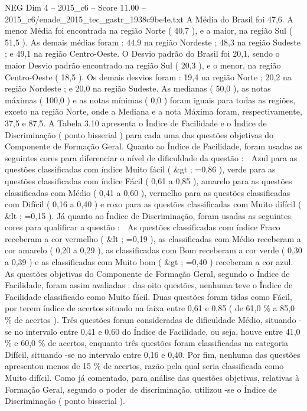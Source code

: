 \begin{textsample}{NEG Dim 4 – 2015\_c6 – Score 11.00 – 2015\_c6/enade\_2015\_tec\_gastr\_1938c9be4e.txt}
A Média do Brasil foi 47,6.
A menor Média foi encontrada na região Norte ( 40,7 ), e a maior, na região Sul ( 51,5 ).
As demais médias foram : 44,9 na região Nordeste ; 48,3 na região Sudeste ; e 49,1 na região Centro-Oeste.
O Desvio padrão do Brasil foi 20,1, sendo o maior Desvio padrão encontrado na região Sul ( 20,3 ), e o menor, na região Centro-Oeste ( 18,5 ).
Os demais desvios foram : 19,4 na região Norte ; 20,2 na região Nordeste ; e 20,0 na região Sudeste.
As medianas ( 50,0 ), as notas máximas ( 100,0 ) e as notas mínimas ( 0,0 ) foram iguais para todas as regiões, exceto na região Norte, onde a Mediana e a nota Máxima foram, respectivamente, 37,5 e 87,5.
A Tabela 3.10 apresenta o Índice de Facilidade e o Índice de Discriminação ( ponto bisserial ) para cada uma das questões objetivas do Componente de Formação Geral.
Quanto ao Índice de Facilidade, foram usadas as seguintes cores para diferenciar o nível de dificuldade da questão :  Azul para as questões classificadas com índice Muito fácil ( \&gt ; =0,86 ), verde para as questões classificadas com índice Fácil ( 0,61 a 0,85 ), amarelo para as questões classificadas com Médio ( 0,41 a 0,60 ), vermelho para as questões classificadas com Difícil ( 0,16 a 0,40 ) e roxo para as questões classificadas com Muito difícil ( \&lt ; =0,15 ).
Já quanto ao Índice de Discriminação, foram usadas as seguintes cores para qualificar a questão :  As questões classificadas com índice Fraco receberam a cor vermelho ( \&lt ; =0,19 ), as classificadas com Médio receberam a cor amarelo ( 0,20 a 0,29 ), as classificadas com Bom receberam a cor verde ( 0,30 a 0,39 ) e as classificadas com Muito bom ( \&gt ; =0,40 ) receberam a cor azul.
As questões objetivas do Componente de Formação Geral, segundo o Índice de Facilidade, foram assim avaliadas : das oito questões, nenhuma teve o Índice de Facilidade classificado como Muito fácil.
Duas questões foram tidas como Fácil, por terem índice de acertos situado na faixa entre 0,61 e 0,85 ( de 61,0 \% a 85,0 \% de acertos ).
Três questões foram consideradas de dificuldade Médio, situando -se no intervalo entre 0,41 e 0,60 do Índice de Facilidade, ou seja, houve entre 41,0 \% e 60,0 \% de acertos, enquanto três questões foram classificadas na categoria Difícil, situando -se no intervalo entre 0,16 e 0,40.
Por fim, nenhuma das questões apresentou menos de 15 \% de acertos, razão pela qual seria classificada como Muito difícil.
Como já comentado, para análise das questões objetivas, relativas à Formação Geral, segundo o poder de discriminação, utilizou -se o Índice de Discriminação ( ponto bisserial ).

\end{textsample}
